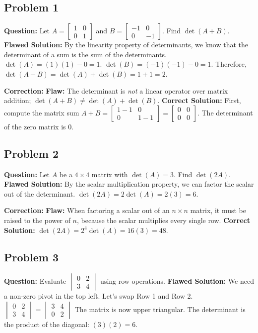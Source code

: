 \documentclass{article}
\begin{document}
\subsection{Problem 1}
\textbf{Question:} Let $A = \begin{bmatrix} 1 & 0 \\ 0 & 1 \end{bmatrix}$ and $B = \begin{bmatrix} -1 & 0 \\ 0 & -1 \end{bmatrix}$. Find $\det(A + B)$.
\textbf{Flawed Solution:}
By the linearity property of determinants, we know that the determinant of a sum is the sum of the determinants.
$\det(A) = (1)(1) - 0 = 1$.
$\det(B) = (-1)(-1) - 0 = 1$.
Therefore, $\det(A + B) = \det(A) + \det(B) = 1 + 1 = 2$.

\textbf{Correction:}
\textbf{Flaw:} The determinant is \textit{not} a linear operator over matrix addition; $\det(A+B) \neq \det(A) + \det(B)$.
\textbf{Correct Solution:} First, compute the matrix sum $A+B = \begin{bmatrix} 1-1 & 0 \\ 0 & 1-1 \end{bmatrix} = \begin{bmatrix} 0 & 0 \\ 0 & 0 \end{bmatrix}$. The determinant of the zero matrix is $0$.

\subsection{Problem 2}
\textbf{Question:} Let $A$ be a $4 \times 4$ matrix with $\det(A) = 3$. Find $\det(2A)$.
\textbf{Flawed Solution:}
By the scalar multiplication property, we can factor the scalar out of the determinant.
$\det(2A) = 2 \det(A) = 2(3) = 6$.

\textbf{Correction:}
\textbf{Flaw:} When factoring a scalar out of an $n \times n$ matrix, it must be raised to the power of $n$, because the scalar multiplies every single row.
\textbf{Correct Solution:} $\det(2A) = 2^4 \det(A) = 16(3) = 48$.

\subsection{Problem 3}
\textbf{Question:} Evaluate $\begin{vmatrix} 0 & 2 \\ 3 & 4 \end{vmatrix}$ using row operations.
\textbf{Flawed Solution:}
We need a non-zero pivot in the top left. Let's swap Row 1 and Row 2.
$\begin{vmatrix} 0 & 2 \\ 3 & 4 \end{vmatrix} = \begin{vmatrix} 3 & 4 \\ 0 & 2 \end{vmatrix}$
The matrix is now upper triangular. The determinant is the product of the diagonal: $(3)(2) = 6$.
\end{document}
